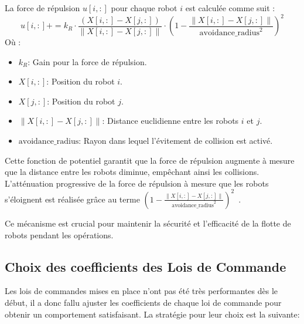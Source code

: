 \documentclass[a4paper,12pt]{article}
\begin{document}
La force de répulsion \( u[i, :] \) pour chaque robot \( i \) est calculée comme suit :
\[
    u[i, :] += k_R \cdot \frac{(X[i, :] - X[j, :])}{\|X[i, :] - X[j, :]\|} \cdot \left(1 - \frac{\|X[i, :] - X[j, :]\|}{\text{avoidance\_radius}^2}\right)^2
\]
Où :
\begin{itemize}
    \item \( k_R \): Gain pour la force de répulsion.
    \item \( X[i, :] \): Position du robot \( i \).
    \item \( X[j, :] \): Position du robot \( j \).
    \item \( \|X[i, :] - X[j, :]\| \): Distance euclidienne entre les robots \( i \) et \( j \).
    \item \( \text{avoidance\_radius} \): Rayon dans lequel l'évitement de collision est activé.
\end{itemize}

Cette fonction de potentiel garantit que la force de répulsion augmente à mesure que la distance entre les robots diminue, empêchant ainsi les collisions. L'atténuation progressive de la force de répulsion à mesure que les robots s'éloignent est réalisée grâce au terme \( \left(1 - \frac{\|X[i, :] - X[j, :]\|}{\text{avoidance\_radius}^2}\right)^2 \)~\cite{lnr_p4}.

Ce mécanisme est crucial pour maintenir la sécurité et l'efficacité de la flotte de robots pendant les opérations.

\subsection*{Choix des coefficients des Lois de Commande}

Les lois de commandes mises en place n'ont pas été très performantes dès le début, il a donc fallu ajuster les coefficients de chaque loi de commande pour obtenir un comportement satisfaisant. La stratégie pour leur choix est la suivante:
\end{document}

